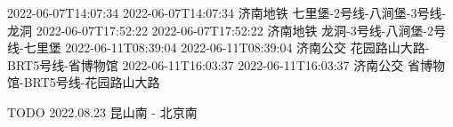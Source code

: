 2022-06-07T14:07:34 2022-06-07T14:07:34 济南地铁 七里堡-2号线-八涧堡-3号线-龙洞
2022-06-07T17:52:22 2022-06-07T17:52:22 济南地铁 龙洞-3号线-八涧堡-2号线-七里堡
2022-06-11T08:39:04 2022-06-11T08:39:04 济南公交 花园路山大路-BRT5号线-省博物馆
2022-06-11T16:03:37 2022-06-11T16:03:37 济南公交 省博物馆-BRT5号线-花园路山大路

TODO
2022.08.23       昆山南 - 北京南


